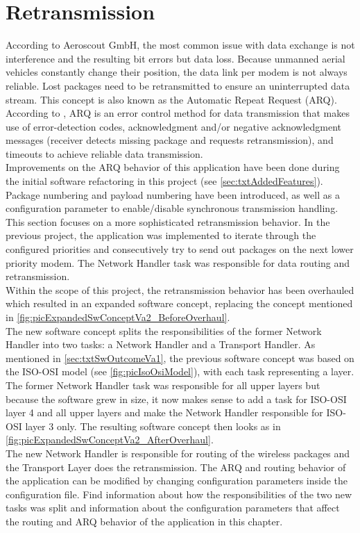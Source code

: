 \section{Retransmission} \label{sec:txtRetransmission}
%
According to Aeroscout GmbH, the most common issue with data exchange is not interference and the resulting bit errors but data loss. Because unmanned aerial vehicles constantly change their position, the data link per modem is not always reliable. Lost packages need to be retransmitted to ensure an uninterrupted data stream. This concept is also known as the Automatic Repeat Request (ARQ). According to \cite{ErrorDetectionAndCorrection_Wikipedia}, ARQ is an error control method for data transmission that makes use of error-detection codes, acknowledgment and/or negative acknowledgment messages (receiver detects missing package and requests retransmission), and timeouts to achieve reliable data transmission.\\
Improvements on the ARQ behavior of this application have been done during the initial software refactoring in this project (see \autoref{sec:txtAddedFeatures}). Package numbering and payload numbering have been introduced, as well as a configuration parameter to enable/disable synchronous transmission handling.\\
This section focuses on a more sophisticated retransmission behavior. In the previous project, the application was implemented to iterate through the configured priorities and consecutively try to send out packages on the next lower priority modem. The Network Handler task was responsible for data routing and retransmission.\\
Within the scope of this project, the retransmission behavior has been overhauled which resulted in an expanded software concept, replacing the concept mentioned in \autoref{fig:picExpandedSwConceptVa2_BeforeOverhaul}.\\ 
The new software concept splits the responsibilities of the former Network Handler into two tasks: a Network Handler and a Transport Handler. As mentioned in \autoref{sec:txtSwOutcomeVa1}, the previous software concept was based on the ISO-OSI model (see \autoref{fig:picIsoOsiModel}), with each task representing a layer. The former Network Handler task was responsible for all upper layers but because the software grew in size, it now makes sense to add a task for ISO-OSI layer 4 and all upper layers and make the Network Handler responsible for ISO-OSI layer 3 only. The resulting software concept then looks as in \autoref{fig:picExpandedSwConceptVa2_AfterOverhaul}.\\
The new Network Handler is responsible for routing of the wireless packages and the Transport Layer does the retransmission. The ARQ and routing behavior of the application can be modified by changing configuration parameters inside the configuration file. Find information about how the responsibilities of the two new tasks was split and information about the configuration parameters that affect the routing and ARQ behavior of the application in this chapter.
%

